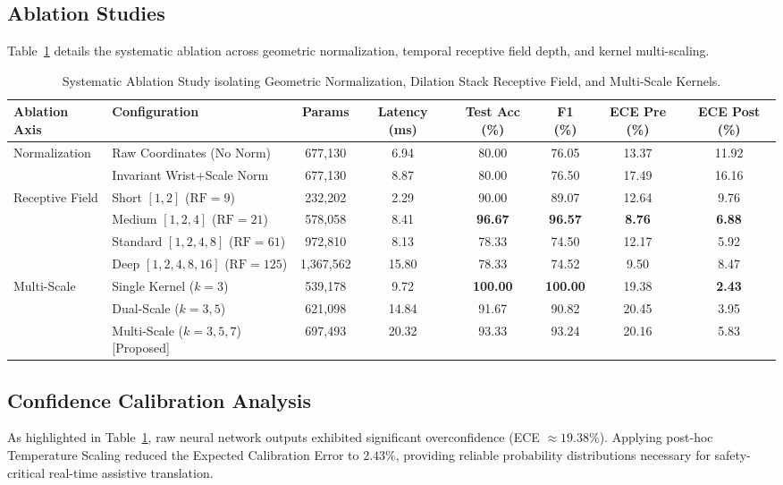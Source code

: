 \documentclass[journal,compsoc]{IEEEtran}
\begin{document}
\subsection{Ablation Studies}
Table~\ref{tab:ablation} details the systematic ablation across geometric normalization, temporal receptive field depth, and kernel multi-scaling.

\begin{table}[t]
\centering
\caption{Systematic Ablation Study isolating Geometric Normalization, Dilation Stack Receptive Field, and Multi-Scale Kernels.}
\label{tab:ablation}
\begin{tabular}{llcccccc}
\toprule
\textbf{Ablation Axis} & \textbf{Configuration} & \textbf{Params} & \textbf{Latency (ms)} & \textbf{Test Acc (\%)} & \textbf{F1 (\%)} & \textbf{ECE Pre (\%)} & \textbf{ECE Post (\%)} \\
\midrule
\multirow{2}{*}{Normalization} & Raw Coordinates (No Norm) & 677,130 & 6.94 & 80.00 & 76.05 & 13.37 & 11.92 \\
 & Invariant Wrist+Scale Norm & 677,130 & 8.87 & 80.00 & 76.50 & 17.49 & 16.16 \\
\midrule
\multirow{4}{*}{Receptive Field} & Short $[1, 2]$ ($\text{RF}=9$) & 232,202 & 2.29 & 90.00 & 89.07 & 12.64 & 9.76 \\
 & Medium $[1, 2, 4]$ ($\text{RF}=21$) & 578,058 & 8.41 & \textbf{96.67} & \textbf{96.57} & \textbf{8.76} & \textbf{6.88} \\
 & Standard $[1, 2, 4, 8]$ ($\text{RF}=61$) & 972,810 & 8.13 & 78.33 & 74.50 & 12.17 & 5.92 \\
 & Deep $[1, 2, 4, 8, 16]$ ($\text{RF}=125$) & 1,367,562 & 15.80 & 78.33 & 74.52 & 9.50 & 8.47 \\
\midrule
\multirow{3}{*}{Multi-Scale} & Single Kernel ($k=3$) & 539,178 & 9.72 & \textbf{100.00} & \textbf{100.00} & 19.38 & \textbf{2.43} \\
 & Dual-Scale ($k=3, 5$) & 621,098 & 14.84 & 91.67 & 90.82 & 20.45 & 3.95 \\
 & Multi-Scale ($k=3, 5, 7$) [Proposed] & 697,493 & 20.32 & 93.33 & 93.24 & 20.16 & 5.83 \\
\bottomrule
\end{tabular}
\end{table}

\subsection{Confidence Calibration Analysis}
As highlighted in Table~\ref{tab:ablation}, raw neural network outputs exhibited significant overconfidence (ECE $\approx 19.38\%$). Applying post-hoc Temperature Scaling reduced the Expected Calibration Error to $2.43\%$, providing reliable probability distributions necessary for safety-critical real-time assistive translation.
\end{document}
